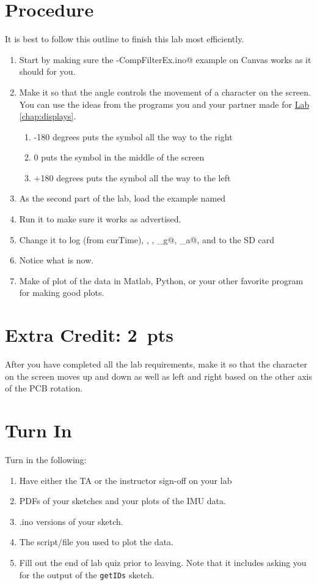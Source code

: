 \section{Procedure}
It is best to follow this outline to finish this lab most efficiently.
\begin{enumerate}
    \item Start by making sure the \lstinline@IMU-CompFilterEx.ino@ example on Canvas works as it should for you.
    \item Make it so that the angle controls the movement of a character on the screen. You can use the ideas 
            from the programs you and your partner made for \hyperref[chap:displays]{Lab \ref*{chap:displays}}.
    \begin{enumerate}
        \item -180 degrees puts the symbol all the way to the right
        \item 0 puts the symbol in the middle of the screen
        \item +180 degrees puts the symbol all the way to the left
    \end{enumerate}
    \item As the second part of the lab, load the example named \lstinline@SDReadWrite@ 
    \item Run it to make sure it works as advertised.
    \item Change it to log \lstinline@t@ (from curTime), \lstinline@ax@, \lstinline@az@, 
            \lstinline@theta_g@, \lstinline@theta_a@, and \lstinline@theta@ to the SD card 
    \item Notice what \lstinline@dt@ is now.
    \item Make of plot of the data in Matlab, Python, or your other favorite program for making good plots.
\end{enumerate}

\section{Extra Credit: 2~pts}
After you have completed all the lab requirements, make it so that the character on the screen moves
up and down as well as left and right based on the other axis of the PCB rotation.

\section{Turn In}
Turn in the following:
\begin{enumerate}
    \item Have either the TA or the instructor sign-off on your lab
    \item PDFs of your sketches and your plots of the IMU data.
    \item .ino versions of your sketch.
    \item The script/file you used to plot the data.
    \item Fill out the end of lab quiz prior to leaving. Note that it includes asking you 
            for the output of the \lstinline$getIDs$ sketch. 
\end{enumerate}

